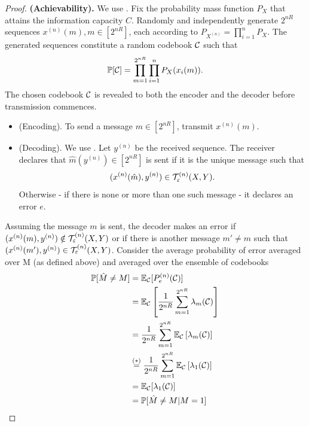 \documentclass[11pt,a4paper]{article}
\begin{document}
\begin{proof}
    \textbf{(Achievability).} We use . Fix the probability mass function $P_X$ that attains the information capacity $C$. Randomly and independently generate $2^{nR}$ sequences $x^{(n)}(m), m \in [2^{nR}]$, each according to $P_{X^{(n)}} = \prod_{i=1}^{n} P_X$. The generated sequences constitute a random codebook $\mathcal{C}$ such that 
    \begin{equation*}
        \mathbb{P}[\mathcal{C}] = \prod_{m=1}^{2^{nR}}\prod_{i=1}^{n} P_X(x_i(m)).
    \end{equation*}
    The chosen codebook $\mathcal{C}$ is revealed to both the encoder and the decoder before transmission commences.

    \begin{itemize}
        \item {(Encoding).} To send a message $m \in [2^{nR}]$, transmit $x^{(n)}(m)$.
        \item {(Decoding).} We use . Let $y^{(n)}$ be the received sequence. The receiver declares that $\hat{m}(y^{(n)}) \in [2^{nR}]$ is sent if it is the unique message such that
        \begin{equation*}
            (x^{(n)}(\hat{m}), y^{(n)}) \in \mathcal{T}^{(n)}_\varepsilon(X,Y).
        \end{equation*}
        Otherwise - if there is none or more than one such message - it declares an error $e$.
    \end{itemize}
    \noindent Assuming the message $m$ is sent, the decoder makes an error if $(x^{(n)}(m), y^{(n)}) \notin \mathcal{T}^{(n)}_\varepsilon(X,Y)$ or if there is another message $m' \neq m$ such that $(x^{(n)}(m'), y^{(n)}) \in \mathcal{T}^{(n)}_\varepsilon(X,Y)$. Consider the average probability of error averaged over M (as defined above) and averaged over the ensemble of codebooks
    \begin{align*}
        \Prob[\hat{M}\neq M] &= \E_{\C}[P^{(n)}_e(\C)] \\
        &= \E_{\C}\left[\dfrac{1}{2^{nR}}\sum_{m=1}^{2^{nR}}\lambda_m(\C)\right] \\
        &= \dfrac{1}{2^{nR}}\sum_{m=1}^{2^{nR}} \E_{\C}\left[\lambda_m(\C)\right] \\
        &\overset{(*)}{=} \dfrac{1}{2^{nR}}\sum_{m=1}^{2^{nR}} \E_{\C}\left[\lambda_1(\C)\right] \\
        &= \E_{\C}[\lambda_1(\C)] \\
        &= \Prob[\hat{M}\neq M| M = 1] \\

\end{align*}
\end{proof}
\end{document}
